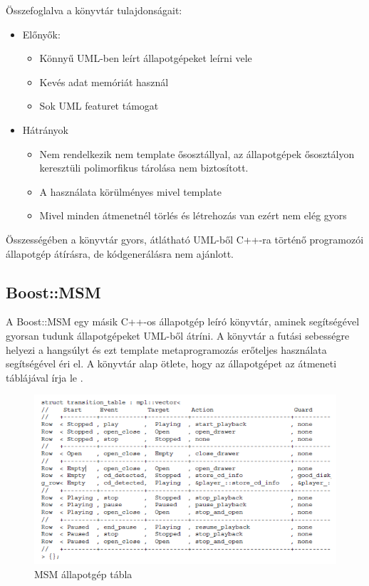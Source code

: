 \documentclass[a4paper,12pt]{report}
\begin{document}
Összefoglalva a könyvtár tulajdonságait:
\begin{itemize}
\item Előnyők:
\begin{itemize}
\item Könnyű UML-ben leírt állapotgépeket leírni vele
\item Kevés adat memóriát használ
\item Sok UML featuret támogat
\end{itemize}
\item Hátrányok
\begin{itemize}
\item Nem rendelkezik nem template ősosztállyal, az állapotgépek ősosztályon keresztüli polimorfikus tárolása nem biztosított.
\item A használata körülményes mivel template
\item Mivel minden átmenetnél törlés és létrehozás van ezért nem elég gyors
\end{itemize}
\end{itemize}

Összességében a könyvtár gyors, átlátható UML-ből C++-ra történő programozói állapotgép átírásra, de kódgenerálásra nem ajánlott. 

\subsection{Boost::MSM}

A Boost::MSM\cite{henry2008meta} egy másik C++-os állapotgép leíró könyvtár, aminek segítségével gyorsan tudunk állapotgépeket UML-ből átríni. A könyvtár a futási sebességre helyezi a hangsúlyt és ezt template metaprogramozás erőteljes használata segítségével éri el. A könyvtár alap ötlete, hogy az állapotgépet az átmeneti táblájával írja le . 

\begin{figure}[hbtp]
\centering
\includegraphics[width=1\textwidth]{msmtable.png}
\caption{MSM állapotgép tábla}
\label{fig:msmat}
\end{figure}
\end{document}
